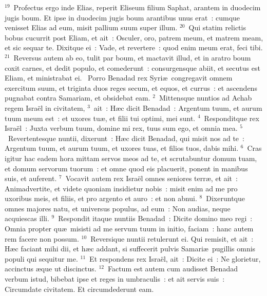 ${}^{19}$~Profectus ergo inde Elias, reperit Eliseum filium Saphat, arantem in duodecim jugis boum. Et ipse in duodecim jugis boum arantibus unus erat~: cumque venisset Elias ad eum, misit pallium suum super illum.
${}^{20}$~Qui statim relictis bobus cucurrit post Eliam, et ait~: Osculer, oro, patrem meum, et matrem meam, et sic sequar te. Dixitque ei~: Vade, et revertere~: quod enim meum erat, feci tibi.
${}^{21}$~Reversus autem ab eo, tulit par boum, et mactavit illud, et in aratro boum coxit carnes, et dedit populo, et comederunt~: consurgensque abiit, et secutus est Eliam, et ministrabat ei.
~\lettrine[lines=10,image=true,loversize=0.05,lraise=-0.03]{P}{}orro Benadad rex Syri\ae\ congregavit omnem exercitum suum, et triginta duos reges secum, et equos, et currus~: et ascendens pugnabat contra Samariam, et obsidebat eam.
${}^{2}$~Mittensque nuntios ad Achab regem Isra\"el in civitatem,
${}^{3}$~ait~: H\ae c dicit Benadad~: Argentum tuum, et aurum tuum meum est~: et uxores tu\ae , et filii tui optimi, mei sunt.
${}^{4}$~Responditque rex Isra\"el~: Juxta verbum tuum, domine mi rex, tuus sum ego, et omnia mea.
${}^{5}$~Revertentesque nuntii, dixerunt~: H\ae c dicit Benadad, qui misit nos ad te~: Argentum tuum, et aurum tuum, et uxores tuas, et filios tuos, dabis mihi.
${}^{6}$~Cras igitur hac eadem hora mittam servos meos ad te, et scrutabuntur domum tuam, et domum servorum tuorum~: et omne quod eis placuerit, ponent in manibus suis, et auferent.
${}^{7}$~Vocavit autem rex Isra\"el omnes seniores terr\ae , et ait~: Animadvertite, et videte quoniam insidietur nobis~: misit enim ad me pro uxoribus meis, et filiis, et pro argento et auro~: et non abnui.
${}^{8}$~Dixeruntque omnes majores natu, et universus populus, ad eum~: Non audias, neque acquiescas illi.
${}^{9}$~Respondit itaque nuntiis Benadad~: Dicite domino meo regi~: Omnia propter qu\ae\ misisti ad me servum tuum in initio, faciam~: hanc autem rem facere non possum.
${}^{10}$~Reversique nuntii retulerunt ei. Qui remisit, et ait~: H\ae c faciant mihi dii, et h\ae c addant, si suffecerit pulvis Samari\ae\ pugillis omnis populi qui sequitur me.
${}^{11}$~Et respondens rex Isra\"el, ait~: Dicite ei~: Ne glorietur, accinctus \ae que ut discinctus.
${}^{12}$~Factum est autem cum audisset Benadad verbum istud, bibebat ipse et reges in umbraculis~: et ait servis suis~: Circumdate civitatem. Et circumdederunt eam.


